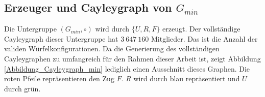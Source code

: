 \documentclass[12pt,a4paper, usenames, dvipsnames]{article}
\theoremstyle{mystyle}
\theoremstyle{definition}
\newcommand{\Gtwo}{\ensuremath{G_{2\times 2\times 2}}}
\begin{document}














%
%
%
%
%
%
%
%
%
%
%
%
%
%
%
%
%
%
\subsection{Erzeuger und Cayleygraph von $G_{min}$}
\label{Abschnitt_CayleygraphMIN}

Die Untergruppe $(G_{min}, \circ)$ wird durch $\{U, R, F\}$ erzeugt. Der vollständige Cayleygraph dieser Untergruppe hat  $3 \ 647 \ 160$ Mitglieder. Das ist die Anzahl der validen Würfelkonfigurationen. %
Da die Generierung des vollständigen Cayleygraphen zu umfangreich für den Rahmen dieser Arbeit ist, 
zeigt Abbildung \ref{Abbildung_Cayleygraph_min} lediglich einen Ausschnitt dieses Graphen. Die roten Pfeile repräsentieren den Zug $F$. $R$ wird durch blau repräsentiert und $U$ durch grün. 
\end{document}
